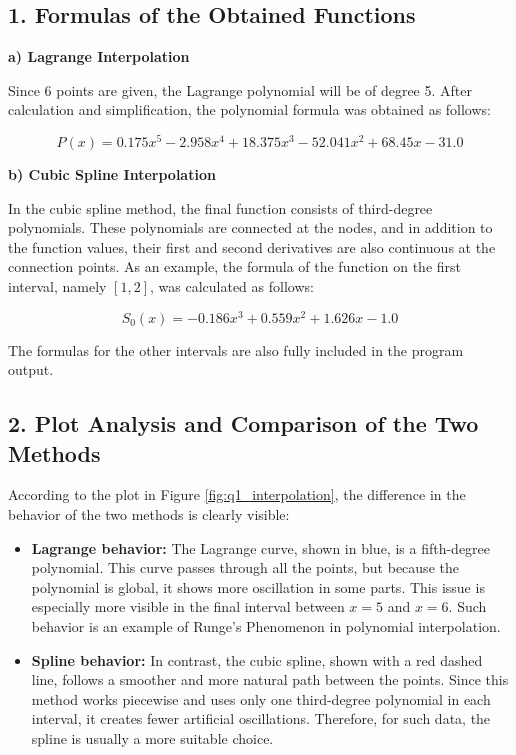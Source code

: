 \documentclass[12pt,a4paper]{article}
\begin{document}
	\subsection*{1. Formulas of the Obtained Functions}
	
	\textbf{a) Lagrange Interpolation}
	
	Since 6 points are given, the Lagrange polynomial will be of degree 5. After calculation and simplification, the polynomial formula was obtained as follows:
	
	\begin{equation}
		P(x)=
		0.175x^5
		- 2.958x^4
		+ 18.375x^3
		- 52.041x^2
		+ 68.45x
		- 31.0
	\end{equation}
	
	\textbf{b) Cubic Spline Interpolation}
	
	In the cubic spline method, the final function consists of third-degree polynomials. These polynomials are connected at the nodes, and in addition to the function values, their first and second derivatives are also continuous at the connection points. As an example, the formula of the function on the first interval, namely
	$[1,2]$,
	was calculated as follows:
	
	\begin{equation}
		S_0(x)=
		-0.186x^3
		+ 0.559x^2
		+ 1.626x
		- 1.0
	\end{equation}
	
	The formulas for the other intervals are also fully included in the program output.
	
	\subsection*{2. Plot Analysis and Comparison of the Two Methods}
	
	According to the plot in Figure
	\ref{fig:q1_interpolation},
	the difference in the behavior of the two methods is clearly visible:
	
	\begin{itemize}
		\item \textbf{Lagrange behavior:}
		The Lagrange curve, shown in blue, is a fifth-degree polynomial. This curve passes through all the points, but because the polynomial is global, it shows more oscillation in some parts. This issue is especially more visible in the final interval between
		$x=5$
		and
		$x=6$.
		Such behavior is an example of Runge's Phenomenon in polynomial interpolation.
		
		\item \textbf{Spline behavior:}
		In contrast, the cubic spline, shown with a red dashed line, follows a smoother and more natural path between the points. Since this method works piecewise and uses only one third-degree polynomial in each interval, it creates fewer artificial oscillations. Therefore, for such data, the spline is usually a more suitable choice.
	\end{itemize}
	
\end{document}
